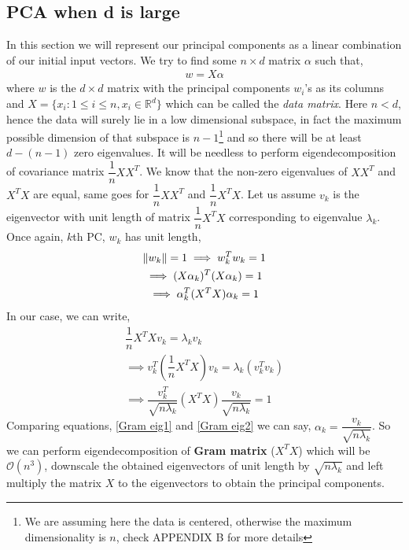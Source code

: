 \documentclass[12pt,a4paper]{article}
\begin{document}
\subsection{PCA when d is large} \label{Alternate perspective}
In this section we will represent our principal components as a linear combination of our initial input vectors. We try to find some $n \times d$ matrix $\alpha$ such that,
\begin{align}
    w  = X \alpha
\end{align}
where $w$ is the $d \times d$ matrix with the principal components $w_i$'s as its columns and $X = \{x_i : 1 \leq i \leq n, x_i \in \mathbb{R}^d\}$ which can be called the \textit{data matrix}. Here $n < d$, hence the data will surely lie in a low dimensional subspace, in fact the maximum possible dimension of that subspace is $n-1$\footnote{We are assuming here the data is centered, otherwise the maximum dimensionality is $n$, check APPENDIX B for more details} and so there will be  at least $d-(n-1)$ zero eigenvalues. It will be needless to perform eigendecomposition of covariance matrix $\dfrac{1}{n}XX^T$. We know that the non-zero eigenvalues of $XX^T$ and $X^TX$ are equal, same goes for $\dfrac{1}{n}XX^T$ and $\dfrac{1}{n}X^TX$. Let us assume $v_k$ is the eigenvector with unit length of matrix $\dfrac{1}{n}X^TX$ corresponding to eigenvalue $\lambda_k$. Once again, $k$th PC, $w_k$ has unit length,
\begin{gather}
    \norm{w_k} = 1 \implies w_k^T w_k = 1 \nonumber \\
    \implies (X \alpha_k)^T (X \alpha_k) =1 \nonumber \\
    \implies \alpha_k^T(X^TX)\alpha_k = 1 \label{Gram eig1}
\end{gather}
In our case, we can write, 
\begin{gather}
    \dfrac{1}{n} X^TX v_k= \lambda_k v_k \nonumber \\
    \implies v_k^T (\dfrac{1}{n} X^TX) v_k = \lambda_k (v_k^Tv_k) \nonumber \\
    \implies \dfrac{v_k^T}{\sqrt{n\lambda_k}} (X^TX) \dfrac{v_k}{\sqrt{n\lambda_k}} = 1 \label{Gram eig2}
\end{gather}
Comparing equations, \eqref{Gram eig1} and \eqref{Gram eig2} we can say, $\alpha_k = \dfrac{v_k}{\sqrt{n \lambda_k}}$.
So we can perform eigendecomposition of \textbf{Gram matrix} ($X^TX$) which will be $\mathcal{O}(n^3)$, downscale the obtained eigenvectors of unit length by $\sqrt{n \lambda_k}$ and left multiply the matrix $X$ to the eigenvectors to obtain the principal components. 
\end{document}
